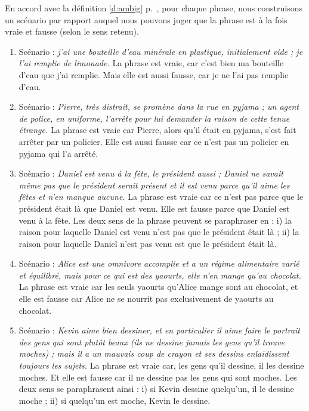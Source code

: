 \begin{exo}[Ambiguïtés]
\begin{solu}
En accord avec la définition \ref{d:ambig} p.~\pageref{d:ambig}, pour chaque phrase, nous construisons un scénario par rapport auquel nous pouvons juger que la phrase est à la fois vraie et fausse (selon le sens retenu).
\begin{enumerate}
\item %
Scénario : \emph{j'ai une bouteille d'eau minérale en plastique, initialement vide ; je l'ai remplie de limonade.} %
La phrase est vraie, car c'est bien ma bouteille d'eau que j'ai remplie.  Mais elle est aussi fausse, car je ne l'ai pas remplie d'eau.
\item %
Scénario : \emph{Pierre, très distrait, se promène dans la rue en pyjama ; un agent de police, en uniforme, l'arrête pour lui demander la raison de cette tenue étrange.} %
La phrase est vraie car Pierre, alors qu'il était en pyjama, s'est fait arrêter par un policier. Elle est aussi fausse car ce n'est pas un policier en pyjama qui l'a arrêté. 
\item %
Scénario : \emph{Daniel est venu à la fête, le président aussi ; Daniel ne savait même pas que le président serait présent et il est venu parce qu'il aime les fêtes et n'en manque aucune.}
La phrase est vraie car ce n'est pas parce que le président était là que Daniel est venu.  Elle est fausse parce que Daniel est venu à la fête.  Les deux sens de la phrase peuvent se paraphraser en : i) la raison pour laquelle Daniel est venu n'est pas que le président était là ; ii) la raison pour laquelle Daniel n'est pas venu est que le président était là.
\item %
Scénario : \emph{Alice est une omnivore accomplie et a un régime alimentaire varié et équilibré, mais pour ce qui est des yaourts, elle n'en mange qu'au chocolat.}
La phrase est vraie car les seuls yaourts qu'Alice mange sont au chocolat, et elle est fausse car Alice ne se nourrit pas exclusivement de yaourts au chocolat.
\item %
Scénario : \emph{Kevin aime bien dessiner, et en particulier il aime faire le portrait des gens qui sont plutôt beaux (ils ne dessine jamais les gens qu'il trouve moches) ; mais il a un mauvais coup de crayon et ses dessins enlaidissent toujours les sujets.}
La phrase est vraie car, les gens qu'il dessine, il les dessine moches. Et elle est fausse car il ne dessine pas les gens qui sont moches.  Les deux sens se paraphrasent ainsi : i) si Kevin dessine quelqu'un, il le dessine moche ; ii) si quelqu'un est moche, Kevin le dessine.
\end{enumerate}
\end{solu}
\end{exo}
